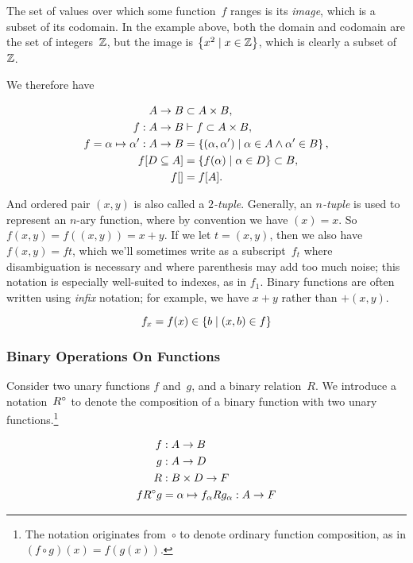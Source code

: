 The set of values over which some function~$f$ ranges is its \emph{image},
  which is a subset of its codomain.
In the example above,
  both the domain and codomain are the set of integers~$\mathbb{Z}$,
  but the image is $\left\{x^2 \mid x\in\mathbb{Z}\right\}$,
    which is clearly a subset of~$\mathbb{Z}$.

We therefore have

\begin{align}
  A \rightarrow B &\subset A\times B, \\
  f : A \rightarrow B &\vdash f \subset A\times B, \\
  f = \alpha \mapsto \alpha' : A \rightarrow B
                  &= \left\{(\alpha,\alpha')
                            \mid \alpha\in A \wedge \alpha'\in B\right\}, \\
  f[D\subseteq A] &= \left\{f(\alpha) \mid \alpha\in D\right\} \subset B, \\
  f[] &= f[A].
\end{align}

And ordered pair $(x,y)$ is also called a \emph{$2$-tuple}.
Generally,
  an \emph{$n$-tuple} is used to represent an $n$-ary function,
    where by convention we have $(x)=x$.
So $f(x,y) = f((x,y)) = x+y$.
If we let $t=(x,y)$,
  then we also have $f(x,y) = ft$,
    which we'll sometimes write as a subscript~$f_t$ where disambiguation is
      necessary and where parenthesis may add too much noise;
        this notation is especially well-suited to indexes,
          as in $f_1$.
Binary functions are often written using \emph{infix} notation;
  for example, we have $x+y$ rather than $+(x,y)$.

\begin{equation}
  f_x = f(x) \in \left\{b \mid (x,b) \in f\right\}
\end{equation}


\subsubsection{Binary Operations On Functions}
Consider two unary functions $f$ and~$g$,
  and a binary relation~$R$.
We introduce a notation~${R}^\circ$ to denote the composition of a binary
  function with two unary functions.\footnote{%
    The notation originates from~$\circ$ to denote ordinary function
      composition,
        as in $(f\circ g)(x) = f(g(x))$.}

\begin{align}
  f &: A \rightarrow B \\
  g &: A \rightarrow D \\
  R &: B\times D \rightarrow F \\
  f {R}^\circ g &= \alpha \mapsto f_\alpha R g_\alpha : A \rightarrow F
\end{align}

